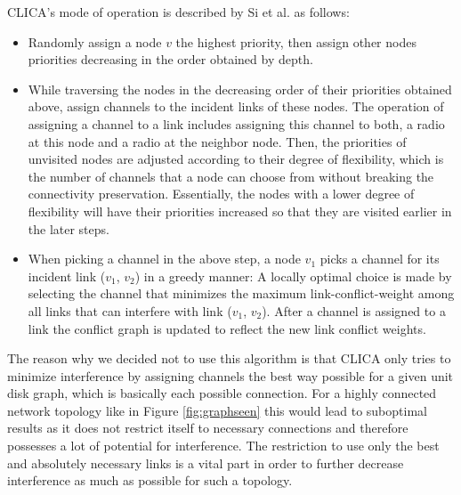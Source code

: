     CLICA's mode of operation is described by Si et al. \cite{overview_caa} as follows:
    \begin{itemize}
      \item Randomly assign a node \(v\) the highest priority, then assign other nodes priorities decreasing in the order obtained by depth.
	
      \item While traversing the nodes in the decreasing order of their priorities obtained above, assign channels to the incident links of these nodes. 
	The operation of assigning a channel to a link includes assigning this channel to both, a radio at this node and a radio at the neighbor node. 
	Then, the priorities of unvisited nodes are adjusted according to their degree of flexibility,
	which is the number of channels that a node can choose from without breaking the connectivity preservation.
	Essentially, the nodes 	with a lower degree of flexibility will have their priorities increased so that they are visited earlier in the later steps.
	
      \item When picking a channel in the above step, a node \(v_1\) picks a channel for its incident link (\(v_1\), \(v_2\)) in a greedy manner:
	A locally optimal choice is made by selecting the channel that minimizes the maximum link-conflict-weight among all links that can interfere with link (\(v_1\), \(v_2\)).
	After a channel is assigned to a link the conflict graph is updated to reflect the new link conflict weights.
    \end{itemize}
  
    The reason why we decided not to use this algorithm is that \ac{CLICA} only tries to minimize interference by assigning channels the best way possible for a given
    unit disk graph, which is basically each possible connection.
    For a highly connected network topology like in Figure \ref{fig:graphseen} this would lead to suboptimal results
    as it does not restrict itself to necessary connections and therefore possesses a lot of potential for interference.
    The restriction to use only the best and absolutely necessary links is a vital part in order to further decrease interference as much as possible for such a topology.
    
\newpage
    
